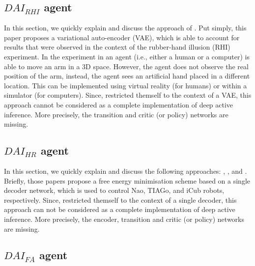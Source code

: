 \documentclass[twoside,11pt]{article}
\begin{document}
\subsection{$DAI_{RHI}$ agent \citep{rood2020deep}}

In this section, we quickly explain and discuss the approach of \citet{rood2020deep}. Put simply, this paper proposes a variational auto-encoder (VAE), which is able to account for results that were observed in the context of the rubber-hand illusion (RHI) experiment. In the experiment in \citet{rood2020deep} an agent (i.e., either a human or a computer) is able to move an arm in a 3D space. However, the agent does not observe the real position of the arm, instead, the agent sees an artificial hand placed in a different location. This can be implemented using virtual reality (for humans) or within a simulator (for computers). Since, \citet{rood2020deep} restricted themself to the context of a VAE, this approach cannot be considered as a complete implementation of deep active inference. More precisely, the transition and critic (or policy) networks are missing.

\subsection{$DAI_{HR}$ agent \citep{sancaktar2020endtoend,DAI_HR,DAI_HR2}}

In this section, we quickly explain and discuss the following approaches: \citet{sancaktar2020endtoend}, \citet{DAI_HR}, and \citet{DAI_HR2}. Briefly, those papers propose a free energy minimisation scheme based on a single decoder network, which is used to control Nao, TIAGo, and iCub robots, respectively. Since, \citet{sancaktar2020endtoend,DAI_HR,DAI_HR2} restricted themself to the context of a single decoder, this approach can not be considered as a complete implementation of deep active inference. More precisely, the encoder, transition and critic (or policy) networks are missing.

\subsection{$DAI_{FA}$ agent \citep{DAI_Kai}} \label{ssec:dai_approach}
\end{document}

